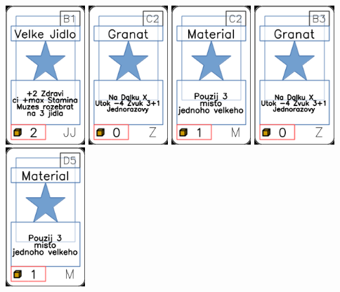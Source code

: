 \documentclass[a4paper]{article}
\begin{document}
	\includegraphics[width=3.0cm]{img-1_35}
	\includegraphics[width=3.0cm]{img-1_101}
	\includegraphics[width=3.0cm]{img-1_41}
	\includegraphics[width=3.0cm]{img-1_97}
	\includegraphics[width=3.0cm]{img-1_49}
\end{document}
